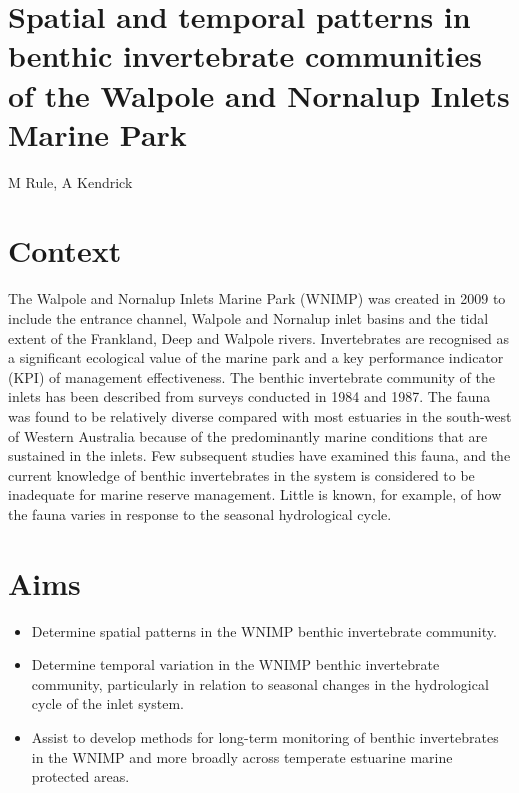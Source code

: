 \documentclass[version=last,
    paper=a4, %
    10pt, %
    usenames,
    dvipsnames,
    oneside, %
    headings=openany, %
    DIV=15 %
]{scrbook}
\begin{document}
\section*{Spatial and temporal patterns in benthic invertebrate communities of the
Walpole and Nornalup Inlets Marine Park
}

M Rule, A Kendrick


\section*{Context}
The Walpole and Nornalup Inlets Marine Park (WNIMP) was created in 2009
to include the entrance channel, Walpole and Nornalup inlet basins and
the tidal extent of the Frankland, Deep and Walpole rivers.
Invertebrates are recognised as a significant ecological value of the
marine park and a key performance indicator (KPI) of management
effectiveness. The benthic invertebrate community of the inlets has been
described from surveys conducted in 1984 and 1987. The fauna was found
to be relatively diverse compared with most estuaries in the south-west
of Western Australia because of the predominantly marine conditions that
are sustained in the inlets. Few subsequent studies have examined this
fauna, and the current knowledge of benthic invertebrates in the system
is considered to be inadequate for marine reserve management. Little is
known, for example, of how the fauna varies in response to the seasonal
hydrological cycle.



\section*{Aims}
\begin{itemize}
\itemsep1pt\parskip0pt
\item
  Determine spatial patterns in the WNIMP benthic invertebrate
  community.
\item
  Determine temporal variation in the WNIMP benthic invertebrate
  community, particularly in relation to seasonal changes in the
  hydrological cycle of the inlet system.
\item
  Assist to develop methods for long-term monitoring of benthic
  invertebrates in the WNIMP and more broadly across temperate estuarine
  marine protected areas.
\end{itemize}
\end{document}
